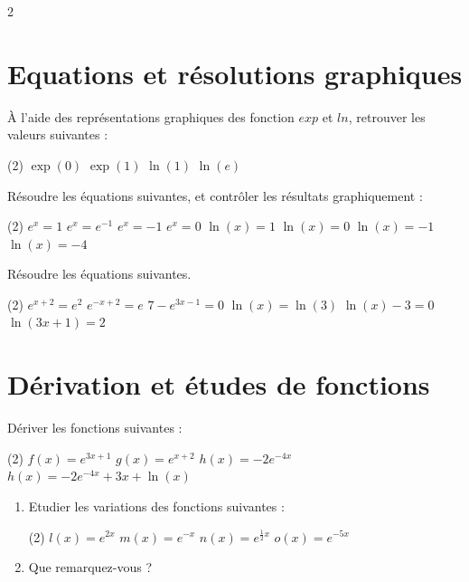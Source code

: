 \documentclass[10pt,a4paper]{article}
\begin{document}
\begin{multicols}{2}

    \section{Equations et résolutions graphiques}
    \begin{exo}[][]
        À l'aide des représentations graphiques des fonction \(exp\) et \(ln\), retrouver les valeurs suivantes :
        \begin{tasks}(2)
        \task \(\exp(0)\)
        \task \(\exp(1)\)
        \task \(\ln(1)\)
        \task \(\ln(e)\)
        \end{tasks}
    \end{exo}

    \begin{exo}[][]
        Résoudre les équations suivantes, et contrôler les résultats graphiquement :
        \begin{tasks}(2)
        \task \(e^x = 1\)
        \task \(e^x = e^{-1}\)
        \task \(e^x = -1\)
        \task \(e^x = 0\)
        \task \(\ln(x) = 1\)
        \task \(\ln(x) = 0\)
        \task \(\ln(x) = -1\)
        \task \(\ln(x) = -4\)
        \end{tasks}
    \end{exo}

    \begin{exo}[][]
        Résoudre les équations suivantes.
        \begin{tasks}(2)
        \task \(e^{x+2} = e^2\)
        \task \(e^{-x+2} = e\)
        \task \(7-e^{3x-1} = 0\)
        \task \(\ln(x) = \ln(3)\)
        \task \(\ln(x) -3 = 0\)
        \task \(\ln(3x+1) = 2\)
        \end{tasks}
    \end{exo}

\section{Dérivation et études de fonctions}

\begin{exo}[][]
    Dériver les fonctions suivantes :
    \begin{tasks}(2)
\task $f(x) = e^{3x+1}$
\task $g(x) = e^{x+2}$
\task $h(x) = -2e^{-4x}$
\task $h(x) = -2e^{-4x}+ 3x + \ln(x)$
\end{tasks}
\end{exo}

\begin{exo}[][]
    \begin{enumerate}
        \item Etudier les variations des fonctions suivantes :\begin{tasks}(2)
            \task $l(x)= e^{2x}$
            \task $m(x)= e^{-x}$
            \task $n(x)=  e^{\frac{1}{2}x}$
            \task $o(x)=  e^{-5x}$
        \end{tasks}
        \item Que remarquez-vous ?
    \end{enumerate}
\end{exo}


\end{multicols}
\end{document}
